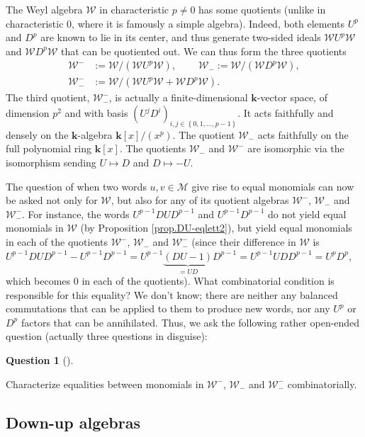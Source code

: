 \documentclass[numbers=enddot,12pt,final,onecolumn,notitlepage]{scrartcl}%
\theoremstyle{definition}
\newtheorem{quest}[theo]{Question}
\newenvironment{question}[1][]
{\begin{quest}[#1]\begin{leftbar}}
{\end{leftbar}\end{quest}}
\newcommand{\W}{\mathcal{W}}
\newcommand{\M}{\mathcal{M}}
\newcommand{\kk}{\mathbf{k}}
\begin{document}
The Weyl algebra $\W$ in characteristic $p\neq0$ has some quotients
(unlike in characteristic $0$, where it is famously a simple algebra). Indeed,
both elements $U^{p}$ and $D^{p}$ are known to lie in its center, and thus
generate two-sided ideals $\W U^{p}\W$ and $\W D^{p}\W$ that can be quotiented out. We can thus form the three
quotients%
\begin{align*}
\W^{-} &:= \W/\left(  \W U^{p}\W\right), \ \ \ \ \ \ \ \ \ \ %
\W_{-}  := \W/\left(  \W D^{p}\W\right)  , \\
\W_{-}^{-} &:= \W/\left(  \W U^{p}\W + \W D^{p}\W\right)  .
\end{align*}
The third quotient, $\W_{-}^{-}$, is actually a finite-dimensional
$\kk$-vector space, of dimension $p^{2}$ and with basis $\left(
U^{j}D^{i}\right)  _{i,j\in\left\{  0,1,\ldots,p-1\right\}  }$. It acts
faithfully and densely on the $\kk$-algebra $\kk\left[  x\right]  /\left(
x^{p}\right)  $. The quotient $\W_{-}$ acts faithfully on the full
polynomial ring $\kk\left[  x\right]  $.
The quotients $\W_{-}$ and $\W^{-}$ are isomorphic via the isomorphism sending
$U\mapsto D$ and $D\mapsto-U$.

The question of when two words $u,v\in\M$ give rise to equal
monomials can now be asked not only for $\W$, but also for any of its
quotient algebras $\W^{-}$, $\W_{-}$ and $\W_{-}^{-}$.
For instance, the words $U^{p-1}DUD^{p-1}$ and $U^{p-1}D^{p-1}$ do
not yield equal monomials in $\W$ (by Proposition
\ref{prop.DU-eqlett2}), but yield equal monomials in each of the quotients
$\W^{-}$, $\W_{-}$ and $\W_{-}^{-}$ (since their
difference in $\W$ is $U^{p-1}DUD^{p-1}-U^{p-1}D^{p-1}=U^{p-1}%
\underbrace{\left(  DU-1\right)  }_{=UD}D^{p-1}=U^{p-1}UDD^{p-1}=U^{p}D^{p}$,
which becomes $0$ in each of the quotients). What combinatorial condition is
responsible for this equality? We don't know; there are neither any balanced
commutations that can be applied to them to produce new words, nor any $U^{p}$
or $D^{p}$ factors that can be annihilated. Thus, we ask the following rather
open-ended question (actually three questions in disguise):

\begin{question}
Characterize equalities between monomials in $\W^{-}$, $\W_{-}$ and $\W_{-}^{-}$ combinatorially.
\end{question}

\subsection{Down-up algebras}
\end{document}
